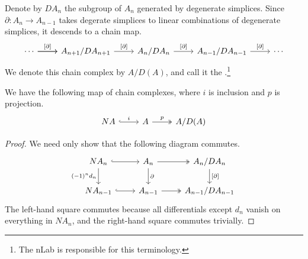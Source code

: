 \documentclass[main.tex]{subfiles}
\begin{document}
\begin{definition}
  \label{def:alternating_face_maps_chain_modulo_degeneracies}
  Denote by $DA_{n}$ the subgroup of $A_{n}$ generated by degenerate simplices. Since $\partial\colon A_{n} \to A_{n-1}$ takes degerate simplices to linear combinations of degenerate simplices, it descends to a chain map.
  \begin{equation*}
    \begin{tikzcd}
      \cdots
      \arrow[r, "{[\partial]}"]
      \arrow[r]
      & A_{n+1}/DA_{n+1}
      \arrow[r, "{[\partial]}"]
      & A_{n}/DA_{n}
      \arrow[r, "{[\partial]}"]
      & A_{n-1}/DA_{n-1}
      \arrow[r, "{[\partial]}"]
      & \cdots
    \end{tikzcd}
  \end{equation*}
  We denote this chain complex by $A/D(A)$, and call it the .\footnote{The nLab is responsible for this terminology.}
\end{definition}

\begin{lemma}
  We have the following map of chain complexes, where $i$ is inclusion and $p$ is projection.
  \begin{equation*}
    \begin{tikzcd}
      NA
      \arrow[r, hook, "i"]
      & A
      \arrow[r, two heads, "p"]
      & A/D(A)
    \end{tikzcd}
  \end{equation*}
\end{lemma}
\begin{proof}
  We need only show that the following diagram commutes.
  \begin{equation*}
    \begin{tikzcd}
      NA_{n}
      \arrow[r, hook]
      \arrow[d, swap, "(-1)^{n} d_{n}"]
      & A_{n}
      \arrow[r, two heads]
      \arrow[d, "\partial"]
      & A_{n}/DA_{n}
      \arrow[d, "{[\partial]}"]
      \\
      NA_{n-1}
      \arrow[r, hook]
      & A_{n-1}
      \arrow[r, two heads]
      & A_{n-1}/DA_{n-1}
    \end{tikzcd}
  \end{equation*}
  The left-hand square commutes because all differentials except $d_{n}$ vanish on everything in $NA_{n}$, and the right-hand square commutes trivially.
\end{proof}
\end{document}
